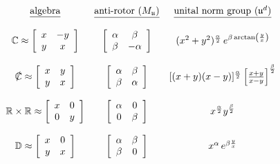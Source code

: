 \documentclass{amsart}
\numberwithin{equation}{section}
\theoremstyle{definition}
\numberwithin{theorem}{section}
\begin{document}
\hspace{.7cm}$ \begin{array}{cccccccc} 
\mbox{\underline{algebra}} & \mbox{\underline{anti-rotor $(M_{\mathfrak{u}})$}} & \mbox{\underline{unital norm group ($\mathfrak{u}^d$)}}  \\ 
\\
\mathbb{C} \approx \left[\begin{array}{ccc}
x  & -y    \\
 y & x \\   
\end{array}\right]   & \left[\begin{array}{ccc}
\alpha  & \beta    \\
 \beta & -\alpha \\   
\end{array}\right]  & (x^2+y^2)^{\frac{\alpha}{2}} \,e^{\beta\,{\rm arctan}\left(\frac{y}{x}\right)}  \\ \\
\slashed{\mathbb{C}} \approx \left[\begin{array}{ccc}
x  & y    \\
 y & x \\   
\end{array}\right]   & \left[\begin{array}{ccc}
\alpha  & \beta    \\
 \beta & \alpha \\   
\end{array}\right]  & [(x+y)(x-y)]^{\frac{\alpha}{2}} \left[\frac{x+y}{x-y}\right]^{\frac{\beta}{2}}  \\ \\ 
\mathbb{R}\times\mathbb{R} \approx \left[\begin{array}{ccc}
x  & 0    \\
 0 & y \\   
\end{array}\right]   & \left[\begin{array}{ccc}
\alpha  & 0    \\
 0 & \beta \\   
\end{array}\right]  & x^\frac{\alpha}{2} y^\frac{\beta}{2}  \\ \\
\mathbb{D} \approx \left[\begin{array}{ccc}
x  & 0    \\
 y & x \\   
\end{array}\right]   & \left[\begin{array}{ccc}
\alpha  & \beta    \\
 \beta & 0 \\   
\end{array}\right]  & x^\alpha\,e^{\beta \frac{y}{x}}  \\ \\
\end{array} $
\end{document}
